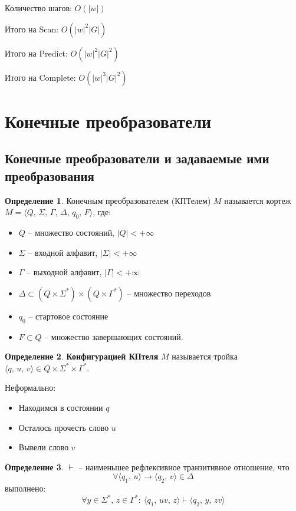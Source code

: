 \documentclass[a4paper,12pt]{article}
\theoremstyle{plain}
\theoremstyle{definition}
\newtheorem{definition}{Определение}[subsection]
\theoremstyle{remark}
\begin{document}
Количество шагов: $O(\vert w\vert)$

Итого на Scan: $O(\vert w\vert^2\vert G\vert)$

Итого на Predict: $O(\vert w\vert^2\vert G\vert^2)$

Итого на Complete: $O(\vert w\vert^3\vert G\vert^2)$

\section{Конечные преобразователи}
\subsection{Конечные преобразователи и задаваемые ими преобразования}
\begin{definition}
	Конечным преобразователем (КПТелем) $M$ называется кортеж $M = \langle Q,\,\Sigma,\,\Gamma,\,\Delta,\, q_0,\, F\rangle$, где:
	\begin{itemize}
		\item $Q$ -- множество состояний, $\vert Q\vert < +\infty$
		\item $\Sigma$ -- входной алфавит, $\vert \Sigma\vert < +\infty$
		\item $\Gamma$ -- выходной алфавит, $\vert \Gamma\vert < +\infty$
		\item $\Delta \subset (Q \times \Sigma^*) \times (Q \times \Gamma^*)$ -- множество переходов
		\item $q_0$ -- стартовое состояние
		\item $F \subset Q$ -- множество завершающих состояний.
	\end{itemize}
\end{definition}

\begin{definition}
	\textbf{Конфигурацией КПтеля} $M$ называется тройка $\langle q,\,u,\,v\rangle \in Q \times \Sigma^* \times \Gamma^*$.

	Неформально:
	\begin{itemize}
		\item Находимся в состоянии $q$
		\item Осталось прочесть слово $u$
		\item Вывели слово $v$
	\end{itemize}
\end{definition}

\begin{definition}
	$\vdash$ -- наименьшее рефлексивное транзитивное отношение, что
	\[
		\forall \langle q_1,\,u\rangle \to\langle q_2,\, v\rangle \in \Delta
	\]
	выполнено:
	\[
		\forall y \in \Sigma^*,\, z \in \Gamma^* :\: \langle q_1,\, uv,\,z\rangle\vdash\langle q_2,\,y,\,zv\rangle
	\]
\end{definition}
\end{document}
